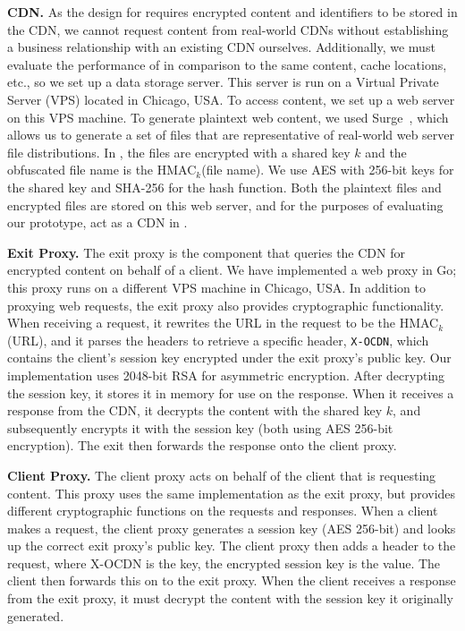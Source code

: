 \textbf{CDN.} As the design for \system{} requires encrypted content and identifiers
to be stored in the CDN, we cannot request content from real-world CDNs without
establishing a business relationship with an existing CDN ourselves. Additionally,
we must evaluate the performance of \system{} in comparison to the same content, cache locations, etc., so 
we set up a data storage server.  This server is run on a Virtual Private Server
(VPS) located in
Chicago, USA.  To access content, we set up a web server on this VPS machine.  To generate 
plaintext web content, we used Surge~\cite{barford1998generating}, which allows us 
to generate a set of files that are representative of real-world web server file distributions.  
In \system{}, the files are encrypted with a shared key $k$ and the obfuscated file name is the 
HMAC$_{k}$(file name).  We use AES with 256-bit keys for the shared key and SHA-256
for the 
hash function.  Both the plaintext files and encrypted files are stored on this web server, and 
for the purposes of evaluating our prototype, act as a CDN in \system{}.

\textbf{Exit Proxy.} The exit proxy is the component that queries the CDN for
encrypted
content on behalf of a client.  We have implemented a web proxy in Go; this proxy
runs on
a different VPS machine in Chicago, USA.  In addition to proxying web requests, the exit 
proxy also provides cryptographic functionality.  When receiving a request, it rewrites
the URL in the request to be the HMAC$_{k}$(URL), and it parses the headers to retrieve a 
specific header, {\tt X-OCDN}, which contains the client's session key encrypted
under the exit
proxy's public key.  Our implementation uses 2048-bit RSA for asymmetric encryption.  After 
decrypting the session key, it stores it in memory for use on the response.  When 
it receives a response from the CDN, it decrypts the content with the shared key $k$, and 
subsequently encrypts it with the session key (both using AES 256-bit encryption).  The 
exit then forwards the response onto the client proxy.

\textbf{Client Proxy.} The client proxy acts on behalf of the client that is
requesting
content.  This proxy uses the same implementation as the exit proxy, but provides 
different cryptographic functions on the requests and responses.  When a client makes 
a request, the client proxy generates a session key  (AES 256-bit) and looks up the correct exit proxy's 
public key.  The client proxy then adds a header to the request, 
where X-OCDN is the key, the encrypted session key is the value.  The client then forwards this on to the 
exit proxy.  When the client receives a response from the exit proxy, it must decrypt the content 
with the session key it originally generated.   
